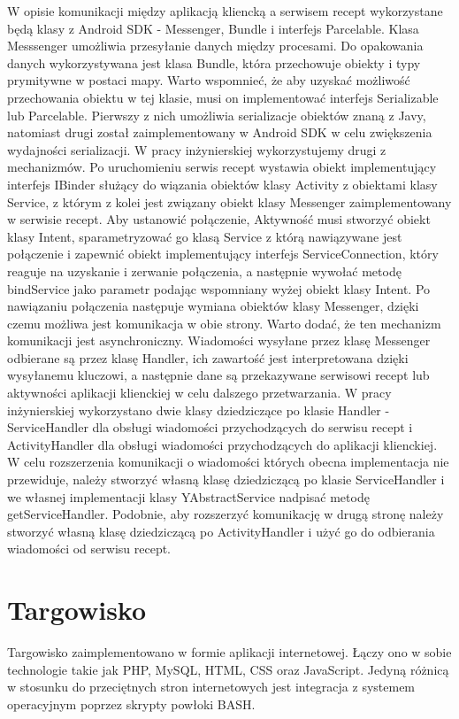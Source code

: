 \documentclass[11pt,a4paper,polish,thesis]{dcsbook}
\begin{document}
W opisie komunikacji między aplikacją kliencką a serwisem recept wykorzystane będą klasy z Android SDK - Messenger, Bundle i interfejs Parcelable. Klasa Messsenger umożliwia przesyłanie danych między procesami. \cite{android.mesage} Do opakowania danych wykorzystywana jest klasa Bundle, która przechowuje obiekty i typy prymitywne w postaci mapy. Warto wspomnieć, że aby uzyskać możliwość przechowania obiektu w tej klasie, musi on implementować interfejs Serializable lub Parcelable. Pierwszy z nich umożliwia serializacje obiektów znaną z Javy, natomiast drugi został zaimplementowany w Android SDK w celu zwiększenia wydajności serializacji. W pracy inżynierskiej wykorzystujemy drugi z mechanizmów. Po uruchomieniu serwis recept wystawia obiekt implementujący interfejs IBinder służący do wiązania obiektów klasy Activity z obiektami klasy Service,  z którym z kolei jest związany obiekt klasy Messenger zaimplementowany w serwisie recept. Aby ustanowić połączenie, Aktywność musi stworzyć obiekt klasy Intent, sparametryzować go klasą Service z którą nawiązywane jest połączenie i zapewnić obiekt implementujący interfejs ServiceConnection, który reaguje na uzyskanie i zerwanie połączenia, a następnie wywołać metodę bindService jako parametr podając wspomniany wyżej obiekt klasy Intent. Po nawiązaniu połączenia następuje wymiana obiektów klasy Messenger, dzięki czemu możliwa jest komunikacja w obie strony. Warto dodać, że ten mechanizm komunikacji jest asynchroniczny. Wiadomości wysyłane przez klasę Messenger odbierane są przez klasę Handler, ich zawartość jest interpretowana dzięki wysyłanemu kluczowi, a następnie dane są przekazywane serwisowi recept lub aktywności aplikacji klienckiej w celu dalszego przetwarzania. W pracy inżynierskiej wykorzystano dwie klasy dziedziczące po klasie Handler - ServiceHandler dla obsługi wiadomości przychodzących do serwisu recept i ActivityHandler dla obsługi wiadomości przychodzących do aplikacji klienckiej. W celu rozszerzenia komunikacji o wiadomości których obecna implementacja nie przewiduje, należy stworzyć własną klasę dziedziczącą po klasie ServiceHandler i we własnej implementacji klasy YAbstractService nadpisać metodę getServiceHandler. Podobnie, aby rozszerzyć komunikację w drugą stronę należy stworzyć własną klasę dziedziczącą po ActivityHandler i użyć go do odbierania wiadomości od serwisu recept.
\section{Targowisko}
Targowisko zaimplementowano w formie aplikacji internetowej. Łączy ono w sobie technologie takie jak PHP, MySQL, HTML, CSS oraz JavaScript. Jedyną różnicą w stosunku
do przeciętnych stron internetowych jest integracja z systemem operacyjnym poprzez skrypty powłoki BASH.
\end{document}
